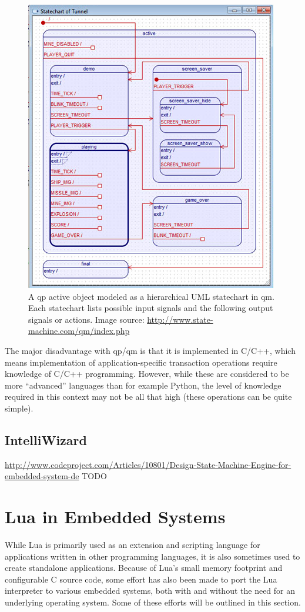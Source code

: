 \begin{figure}[h]
	\centering
	\includegraphics[scale=0.6]{img/qm_statechart.png}
	\caption[An UML statechart in QM]{A \gls{qp} active object modeled as a hierarchical UML statechart in \gls{qm}. Each statechart lists possible input signals and the following output signals or actions. Image source: \url{http://www.state-machine.com/qm/index.php} \label{figure:qm_statechart} }
\end{figure}

The major disadvantage with \gls{qp}/\gls{qm} is that it is implemented in C/C++, which means implementation of application-specific transaction operations require knowledge of C/C++ programming. However, while these are considered to be more “advanced” languages than for example Python, the level of knowledge required in this context may not be all that high (these operations can be quite simple).

\subsection{IntelliWizard}
\label{sec:intelliwizard}
\url{http://www.codeproject.com/Articles/10801/Design-State-Machine-Engine-for-embedded-system-de}
TODO

\section{Lua in Embedded Systems}
\label{sec:lua_in_embedded}
While Lua is primarily used as an extension and scripting language for applications written in other programming languages, it is also sometimes used to create standalone applications. Because of Lua's small memory footprint and configurable C source code, some effort has also been made to port the Lua interpreter to various embedded systems, both with and without the need for an underlying operating system. Some of these efforts will be outlined in this section.

